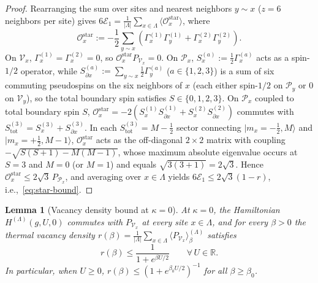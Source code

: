 \documentclass[11pt]{article}
\newtheorem{lemma}[theorem]{Lemma}
\theoremstyle{definition}
\theoremstyle{remark}
\newcommand{\calP}{\mathcal{P}}
\newcommand{\calV}{\mathcal{V}}
\newcommand{\calE}{\mathcal{E}}
\newcommand{\calO}{\mathcal{O}}
\newcommand{\bbR}{\mathbb{R}}
\begin{document}
\begin{proof}
Rearranging the sum over sites and nearest neighbors $y \sim x$ ($z = 6$ neighbors per site) gives $6\calE_1 = \frac{1}{|\Lambda|}\sum_{x \in \Lambda} \langle \calO_x^{\mathrm{star}} \rangle$, where
\begin{equation*}
\calO_x^{\mathrm{star}} := -\frac{1}{2} \sum_{y \sim x} \left(\Gamma_x^{(1)}\Gamma_y^{(1)} + \Gamma_x^{(2)}\Gamma_y^{(2)}\right).
\end{equation*}
On $\calV_x$, $\Gamma_x^{(1)} = \Gamma_x^{(2)} = 0$, so $\calO_x^{\mathrm{star}} P_{\calV_x} = 0$. On $\calP_x$, $S_x^{(a)} := \frac{1}{2}\Gamma_x^{(a)}$ acts as a spin-$1/2$ operator, while $S_{\partial x}^{(a)} := \sum_{y \sim x} \frac{1}{2}\Gamma_y^{(a)}$ ($a \in \{1,2,3\}$) is a sum of six commuting pseudospins on the six neighbors of $x$ (each either spin-$1/2$ on $\calP_y$ or $0$ on $\calV_y$), so the total boundary spin satisfies $S \in \{0, 1, 2, 3\}$. On $\calP_x$ coupled to total boundary spin $S$, $\calO_x^{\mathrm{star}} = -2(S_x^{(1)} S_{\partial x}^{(1)} + S_x^{(2)} S_{\partial x}^{(2)})$ commutes with $S_{\mathrm{tot}}^{(3)} = S_x^{(3)} + S_{\partial x}^{(3)}$. In each $S_{\mathrm{tot}}^{(3)} = M - \frac{1}{2}$ sector connecting $|m_x = -\frac{1}{2}, M\rangle$ and $|m_x = +\frac{1}{2}, M-1\rangle$, $\calO_x^{\mathrm{star}}$ acts as the off-diagonal $2\times 2$ matrix with coupling $-\sqrt{S(S+1) - M(M-1)}$, whose maximum absolute eigenvalue occurs at $S = 3$ and $M = 0$ (or $M=1$) and equals $\sqrt{3(3+1)} = 2\sqrt{3}$. Hence $\calO_x^{\mathrm{star}} \le 2\sqrt{3}\, P_{\calP_x}$, and averaging over $x \in \Lambda$ yields $6\calE_1 \le 2\sqrt{3}(1 - r)$, i.e.,~\eqref{eq:star-bound}.
\end{proof}

\begin{lemma}[Vacancy density bound at $\kappa = 0$]\label{lem:vacancy}
At $\kappa = 0$, the Hamiltonian $H^{(\Lambda)}(g, U, 0)$ commutes with $P_{\calV_x}$ at every site $x \in \Lambda$, and for every $\beta > 0$ the thermal vacancy density $r(\beta) = \frac{1}{|\Lambda|}\sum_{x \in \Lambda} \langle P_{\calV_x}\rangle_\beta^{(\Lambda)}$ satisfies
\begin{equation}\label{eq:r-bound}
r(\beta) \le \frac{1}{1 + e^{\beta U/2}} \qquad \forall\, U \in \bbR.
\end{equation}
In particular, when $U \ge 0$, $r(\beta) \le (1 + e^{\beta_0 U/2})^{-1}$ for all $\beta \ge \beta_0$.
\end{lemma}
\end{document}
